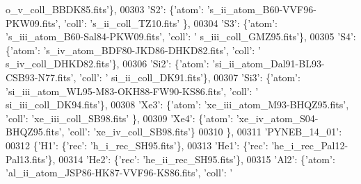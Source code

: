 \begin{DoxyCode}
{      o\_v\_coll\_BBDK85.fits'}\},
00303                              \textcolor{stringliteral}{'S2'}: \{\textcolor{stringliteral}{'atom'}: \textcolor{stringliteral}{'s\_ii\_atom\_B60-VVF96-PKW09.fits'}, \textcolor{stringliteral}{'coll'}: \textcolor{stringliteral}{'s\_ii\_coll\_TZ10.fits'}
      \},
00304                              \textcolor{stringliteral}{'S3'}: \{\textcolor{stringliteral}{'atom'}: \textcolor{stringliteral}{'s\_iii\_atom\_B60-Sal84-PKW09.fits'}, \textcolor{stringliteral}{'coll'}: \textcolor{stringliteral}{'
      s\_iii\_coll\_GMZ95.fits'}\},
00305                              \textcolor{stringliteral}{'S4'}: \{\textcolor{stringliteral}{'atom'}: \textcolor{stringliteral}{'s\_iv\_atom\_BDF80-JKD86-DHKD82.fits'}, \textcolor{stringliteral}{'coll'}: \textcolor{stringliteral}{'
      s\_iv\_coll\_DHKD82.fits'}\},
00306                              \textcolor{stringliteral}{'Si2'}: \{\textcolor{stringliteral}{'atom'}: \textcolor{stringliteral}{'si\_ii\_atom\_Dal91-BL93-CSB93-N77.fits'}, \textcolor{stringliteral}{'coll'}: \textcolor{stringliteral}{'
      si\_ii\_coll\_DK91.fits'}\},
00307                              \textcolor{stringliteral}{'Si3'}: \{\textcolor{stringliteral}{'atom'}: \textcolor{stringliteral}{'si\_iii\_atom\_WL95-M83-OKH88-FW90-KS86.fits'}, \textcolor{stringliteral}{'coll'}: \textcolor{stringliteral}{'
      si\_iii\_coll\_DK94.fits'}\},
00308                              \textcolor{stringliteral}{'Xe3'}: \{\textcolor{stringliteral}{'atom'}: \textcolor{stringliteral}{'xe\_iii\_atom\_M93-BHQZ95.fits'}, \textcolor{stringliteral}{'coll'}: \textcolor{stringliteral}{'xe\_iii\_coll\_SB98.fits'}
      \},
00309                              \textcolor{stringliteral}{'Xe4'}: \{\textcolor{stringliteral}{'atom'}: \textcolor{stringliteral}{'xe\_iv\_atom\_S04-BHQZ95.fits'}, \textcolor{stringliteral}{'coll'}: \textcolor{stringliteral}{'xe\_iv\_coll\_SB98.fits'}\}
00310                              \},
00311                            \textcolor{stringliteral}{'PYNEB\_14\_01'}:
00312                             \{\textcolor{stringliteral}{'H1'}: \{\textcolor{stringliteral}{'rec'}: \textcolor{stringliteral}{'h\_i\_rec\_SH95.fits'}\},
00313                              \textcolor{stringliteral}{'He1'}: \{\textcolor{stringliteral}{'rec'}: \textcolor{stringliteral}{'he\_i\_rec\_Pal12-Pal13.fits'}\},
00314                              \textcolor{stringliteral}{'He2'}: \{\textcolor{stringliteral}{'rec'}: \textcolor{stringliteral}{'he\_ii\_rec\_SH95.fits'}\},
00315                              \textcolor{stringliteral}{'Al2'}: \{\textcolor{stringliteral}{'atom'}: \textcolor{stringliteral}{'al\_ii\_atom\_JSP86-HK87-VVF96-KS86.fits'}, \textcolor{stringliteral}{'coll'}: \textcolor{stringliteral}{'
}
\end{DoxyCode}
